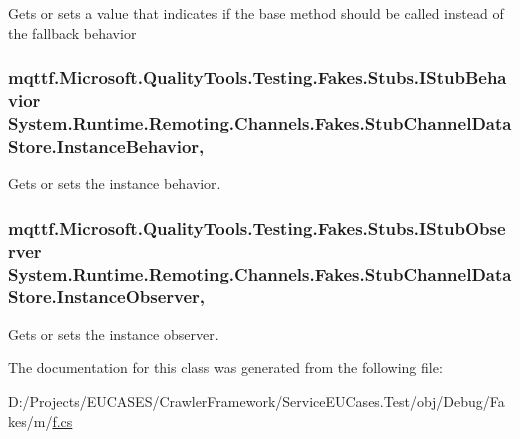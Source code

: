 Gets or sets a value that indicates if the base method should be called instead of the fallback behavior

\hypertarget{class_system_1_1_runtime_1_1_remoting_1_1_channels_1_1_fakes_1_1_stub_channel_data_store_acd92ed2c55f137e4af9351e3ebd0259c}{
\subsubsection[{Instance\-Behavior}]{\setlength{\rightskip}{0pt plus 5cm}mqttf.\-Microsoft.\-Quality\-Tools.\-Testing.\-Fakes.\-Stubs.\-I\-Stub\-Behavior System.\-Runtime.\-Remoting.\-Channels.\-Fakes.\-Stub\-Channel\-Data\-Store.\-Instance\-Behavior\hspace{0.3cm}{\ttfamily [get]}, {\ttfamily [set]}}}\label{class_system_1_1_runtime_1_1_remoting_1_1_channels_1_1_fakes_1_1_stub_channel_data_store_acd92ed2c55f137e4af9351e3ebd0259c}


Gets or sets the instance behavior.

\hypertarget{class_system_1_1_runtime_1_1_remoting_1_1_channels_1_1_fakes_1_1_stub_channel_data_store_a918e0ceeb262cdfb4c813673a28f917b}{
\subsubsection[{Instance\-Observer}]{\setlength{\rightskip}{0pt plus 5cm}mqttf.\-Microsoft.\-Quality\-Tools.\-Testing.\-Fakes.\-Stubs.\-I\-Stub\-Observer System.\-Runtime.\-Remoting.\-Channels.\-Fakes.\-Stub\-Channel\-Data\-Store.\-Instance\-Observer\hspace{0.3cm}{\ttfamily [get]}, {\ttfamily [set]}}}\label{class_system_1_1_runtime_1_1_remoting_1_1_channels_1_1_fakes_1_1_stub_channel_data_store_a918e0ceeb262cdfb4c813673a28f917b}


Gets or sets the instance observer.



The documentation for this class was generated from the following file\-:\begin{DoxyCompactItemize}
\item 
D\-:/\-Projects/\-E\-U\-C\-A\-S\-E\-S/\-Crawler\-Framework/\-Service\-E\-U\-Cases.\-Test/obj/\-Debug/\-Fakes/m/\hyperlink{m_2f_8cs}{f.\-cs}\end{DoxyCompactItemize}
